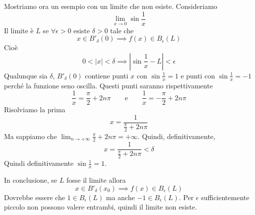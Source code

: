 \begin{example}
Mostriamo ora un esempio con un limite che non esiste. Consideriamo
\begin{equation*}
\lim_{x \to 0} \sin \frac{1}{x}
\end{equation*}
Il limite è $L$ se $\forall \epsilon > 0$ esiste $\delta > 0$ tale che
\begin{equation*}
x \in B'_\delta (0) \implies f(x) \in B_\epsilon (L)
\end{equation*}
Cioè
\begin{equation*}
0 < |x| < \delta \implies \left\lvert \sin \frac{1}{x} - L \right\rvert < \epsilon
\end{equation*}
Qualunque sia $\delta$, $B'_\delta(0)$ contiene punti $x$ con $\sin \frac{1}{x} = 1$ e punti con $\sin \frac{1}{x} = -1$ perché la funzione seno oscilla. Questi punti saranno rispettivamente
\begin{equation*}
\frac{1}{x} = \frac{\pi}{2} + 2n\pi \qquad \text{e} \qquad \frac{1}{x} = -\frac{\pi}{2} + 2n\pi
\end{equation*}
Risolviamo la prima
\begin{equation*}
x = \frac{1}{\frac{\pi}{2} + 2n\pi}
\end{equation*}
Ma sappiamo che $\lim_{n \to +\infty} \frac{\pi}{2} + 2n\pi = +\infty$. Quindi, definitivamente,
\begin{equation*}
x = \frac{1}{\frac{\pi}{2} + 2n\pi} < \delta
\end{equation*}
Quindi definitivamente $\sin \frac{1}{x} = 1$.

In conclusione, se $L$ fosse il limite allora
\begin{equation*}
x \in B'_\delta (x_0) \implies f(x) \in B_\epsilon (L)
\end{equation*}
Dovrebbe essere che $1 \in B_\epsilon (L)$ ma anche $-1 \in B_\epsilon (L)$. Per $\epsilon$ sufficientemente piccolo non possono valere entrambi, quindi il limite non esiste.
\end{example}


